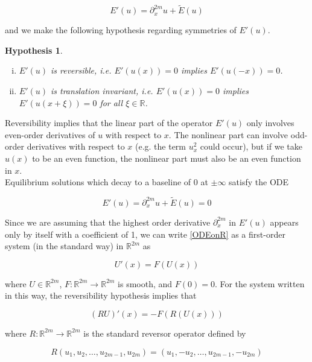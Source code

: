 \documentclass[12pt]{article}
\def\R{{\mathbb R}}
\newtheorem{hypothesis}{Hypothesis}
\begin{document}
\[
E'(u) = \partial_x^{2m}u + \tilde{E}(u)
\]

and we make the following hypothesis regarding symmetries of $E'(u)$.

\begin{hypothesis}\label{reversiblehyp}
\begin{enumerate}[(i)]
\item $E'(u)$ is reversible, i.e. $E'(u(x)) = 0$ implies $E'(u(-x)) = 0$.
\item $E'(u)$ is translation invariant, i.e. $E'(u(x)) = 0$ implies $E'(u(x + \xi)) = 0$ for all $\xi \in \R$.
\end{enumerate}
\end{hypothesis}

Reversibility implies that the linear part of the operator $E'(u)$ only involves even-order derivatives of $u$ with respect to $x$. The nonlinear part can involve odd-order derivatives with respect to $x$ (e.g. the term $u_x^2$ could occur), but if we take $u(x)$ to be an even function, the nonlinear part must also be an even function in $x$.\\

Equilibrium solutions which decay to a baseline of 0 at $\pm \infty$ satisfy the ODE 

\begin{equation}\label{ODEonR}
E'(u) = \partial_x^{2m}u + \tilde{E}(u) = 0
\end{equation}

Since we are assuming that the highest order derivative $\partial_x^{2m}$ in $E'(u)$ appears only by itself with a coefficient of 1, we can write \eqref{ODEonR} as a first-order system (in the standard way) in $\R^{2m}$ as

\begin{equation}\label{genODE}
U'(x) = F(U(x))
\end{equation}

where $U \in \R^{2m}$, $F: \R^{2m} \rightarrow \R^{2m}$ is smooth, and $F(0) = 0$. For the system written in this way, the reversibility hypothesis implies that

\begin{equation}\label{genODErev}
(RU)'(x) = -F(R(U(x)))
\end{equation}

where $R:\R^{2m} \rightarrow \R^{2m}$ is the standard reversor operator defined by

\begin{equation}\label{reverserR2m}
R(u_1, u_2, \dots, u_{2m-1}, u_{2m}) = (u_1, -u_2, \dots, u_{2m-1}, -u_{2m})
\end{equation}
\end{document}
